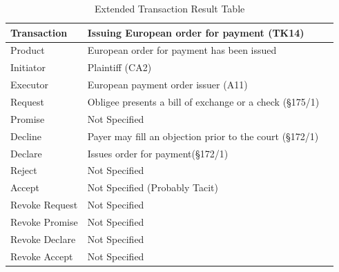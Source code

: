 \begin{landscape}
\begin{table}[h]
\caption{Extended Transaction Result Table}
\label{tab:etrt}
\begin{tabular}{|l||l|l|}
\hline
Transaction  &  Issuing European order for payment (TK14) \\ \hline
Product      &  European order for payment has been issued \\ \hline
Initiator      &  Plaintiff (CA2) \\ \hline
Executor       & European payment order issuer (A11) \\ \hline
Request        &    Obligee presents a bill of exchange or a check (\S175/1)
  \\ \hline
Promise        &    Not Specified   \\ \hline
Decline        &  Payer may fill an objection prior to the court (\S172/1)  \\ \hline
Declare        &  Issues order for payment(\S172/1)  \\ \hline
Reject         &  Not Specified   \\ \hline
Accept         & Not Specified (Probably Tacit) \\ \hline
Revoke Request & Not Specified    \\ \hline
Revoke Promise & Not Specified  \\ \hline
Revoke Declare & Not Specified      \\ \hline
Revoke Accept  &  Not Specified \\ \hline
\end{tabular}
\end{table}


\end{landscape}
